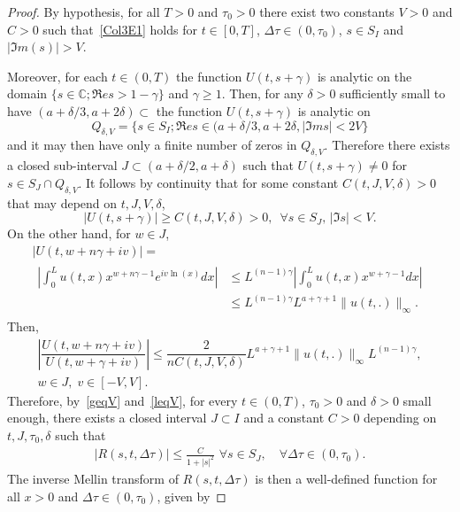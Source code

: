 \documentclass[AHL,Unicode,longabstracts,published]{cedram}
\newcommand*\dst{\displaystyle}
\newcommand*\C{\mathbb{C}}
\let\oldforall\forall
\renewcommand*{\forall}{\mathrel{\oldforall}}
\begin{document}
\begin{proof}
By hypothesis, for all $T>0$ and $\tau _0>0$ there exist two constants $V>0$ and $C>0$ such that~\eqref{Col3E1} holds for $t\in [0, T]$, $\Delta \tau \in (0, \tau _0)$, $s\in S_I$ and $|\Im m(s)|>V$. 


Moreover, for each $t\in (0, T)$ the function $U(t, s+\gamma)$ is analytic on the domain $\{s\in \C; \Re e s>1-\gamma\}$ and $\gamma \ge 1$. Then, for any $\delta >0$ sufficiently small to have $(a+\delta/3, a+2\delta)\subset $ the function $U(t, s+\gamma)$ is analytic on
\[
Q_{\delta, V}=\{s\in S_I; \Re e s\in (a+\delta/3, a+2\delta, |\Im m s|<2V\}
\]
and it may then have only a finite number of zeros in $Q_{\delta, V}$. Therefore there exists a closed sub-interval $J\subset (a+\delta /2, a+\delta)$ such that $U(t, s+\gamma)\not =0$ for $s\in S_J\cap Q_{\delta, V}$. It follows by continuity that for some constant $C(t, J, V, \delta)>0$ that may depend on $t, J, V, \delta $,
\begin{equation}\label{prop3E5}
|U(t, s+\gamma)|\ge C(t, J, V, \delta)>0,\,\,\,\forall s\in S_J,\,|\Im s|<V.
\end{equation}
On the other hand, for $w\in J$,
\begin{multline*}
|U(t,w+n\gamma+iv)|=\\
\begin{aligned}
\left| \dst\int_0^{L} u(t,x) x^{w+n\gamma-1}e^{iv\ln(x)}dx \right|
&\leq
L^{(n-1)\gamma} \left| \dst\int_0^{L} u(t,x) x^{w+\gamma- 1}dx \right|
\\
&\leq L^{(n-1)\gamma} L^{a+\gamma+1} \|u(t,.)\|_{\infty}.
\end{aligned}
\end{multline*}
Then,
\begin{multline}\label{leqV}
\left|\dfrac{ U(t,w +n\gamma+ iv)}{ U(t,w +\gamma+ iv)}\right|\leq \dfrac{2}{n C(t, J, V, \delta)}L^{a+\gamma+1} \|u(t,.)\|_{\infty} L^{(n-1)\gamma}, \\
w\in J,\; v\in [-V,V].
\end{multline}
Therefore, by~\eqref{geqV} and~\eqref{leqV}, for every $t\in (0, T)$, $\tau _0 >0$ and $\delta >0$ small enough, there exists a closed interval $J\subset I$ and a constant $C>0$ depending on $t, J, \tau _0, \delta $ such that
\begin{align}\label{prop3E1}
\left|R(s, t, \Delta \tau)\right|\le \frac{C}{1+|s|^2}\,\,\forall s\in S_J,\quad\forall \Delta \tau \in (0, \tau _0).
\end{align}
The inverse Mellin transform of $R(s, t, \Delta \tau)$ is then a well-defined function for all $x>0$ and $\Delta \tau \in (0, \tau _0)$, given by

\end{proof}
\end{document}
